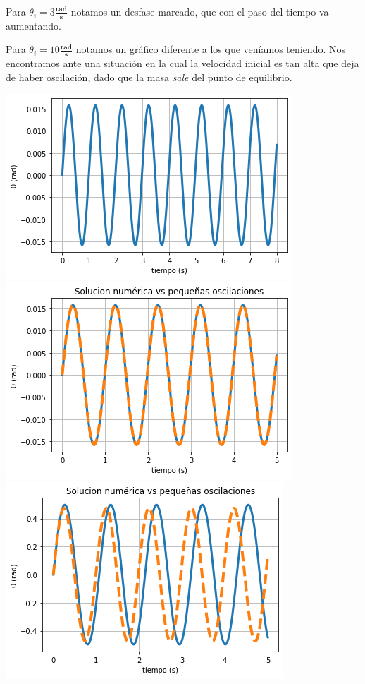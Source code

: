 \documentclass{article}
\begin{document}
\begin{enumerate}
		
		
		Para $\dot{\theta}_i = 3 \frac{\textbf{rad}}{\textbf{s}}$ notamos un desfase marcado, que con el paso del tiempo va aumentando.
		
		
		
		Para $\dot{\theta}_i = 10 \frac{\textbf{rad}}{\textbf{s}}$ notamos un gr\'afico diferente a los que ven\'iamos teniendo. Nos encontramos ante una situaci\'on en la cual la velocidad inicial es tan alta que deja de haber oscilaci\'on, dado que la masa \emph{sale} del punto de equilibrio.
		
		\includegraphics[scale=0.5]{03.png}
		\includegraphics[scale=0.5]{04.png}
		\includegraphics[scale=0.5]{05.png}

\end{enumerate}
\end{document}
